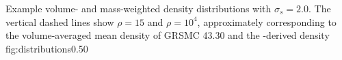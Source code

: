 {Example volume- and mass-weighted density distributions with $\sigma_s=2.0$.
The vertical dashed lines show $\rho = 15$ and $\rho=10^4$, approximately
corresponding to the volume-averaged mean density of GRSMC 43.30 and the
\formaldehyde-derived density}
{fig:distributions}{0.5}{0}

% 

% 


